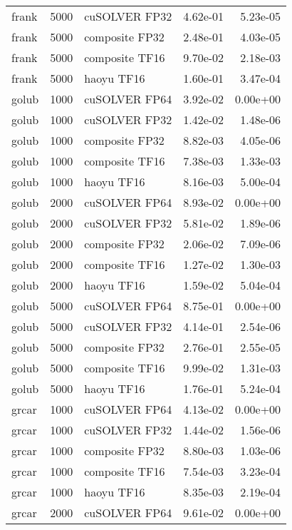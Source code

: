 \begin{table}
\begin{tabular}{lrlrr}
    frank &  5000 &  cuSOLVER FP32 &  4.62e-01 &        5.23e-05 \\
    frank &  5000 & composite FP32 &  2.48e-01 &        4.03e-05 \\
    frank &  5000 & composite TF16 &  9.70e-02 &        2.18e-03 \\
    frank &  5000 &     haoyu TF16 &  1.60e-01 &        3.47e-04 \\
    golub &  1000 &  cuSOLVER FP64 &  3.92e-02 &        0.00e+00 \\
    golub &  1000 &  cuSOLVER FP32 &  1.42e-02 &        1.48e-06 \\
    golub &  1000 & composite FP32 &  8.82e-03 &        4.05e-06 \\
    golub &  1000 & composite TF16 &  7.38e-03 &        1.33e-03 \\
    golub &  1000 &     haoyu TF16 &  8.16e-03 &        5.00e-04 \\
    golub &  2000 &  cuSOLVER FP64 &  8.93e-02 &        0.00e+00 \\
    golub &  2000 &  cuSOLVER FP32 &  5.81e-02 &        1.89e-06 \\
    golub &  2000 & composite FP32 &  2.06e-02 &        7.09e-06 \\
    golub &  2000 & composite TF16 &  1.27e-02 &        1.30e-03 \\
    golub &  2000 &     haoyu TF16 &  1.59e-02 &        5.04e-04 \\
    golub &  5000 &  cuSOLVER FP64 &  8.75e-01 &        0.00e+00 \\
    golub &  5000 &  cuSOLVER FP32 &  4.14e-01 &        2.54e-06 \\
    golub &  5000 & composite FP32 &  2.76e-01 &        2.55e-05 \\
    golub &  5000 & composite TF16 &  9.99e-02 &        1.31e-03 \\
    golub &  5000 &     haoyu TF16 &  1.76e-01 &        5.24e-04 \\
    grcar &  1000 &  cuSOLVER FP64 &  4.13e-02 &        0.00e+00 \\
    grcar &  1000 &  cuSOLVER FP32 &  1.44e-02 &        1.56e-06 \\
    grcar &  1000 & composite FP32 &  8.80e-03 &        1.03e-06 \\
    grcar &  1000 & composite TF16 &  7.54e-03 &        3.23e-04 \\
    grcar &  1000 &     haoyu TF16 &  8.35e-03 &        2.19e-04 \\
    grcar &  2000 &  cuSOLVER FP64 &  9.61e-02 &        0.00e+00 \\

\end{tabular}
\end{table}
